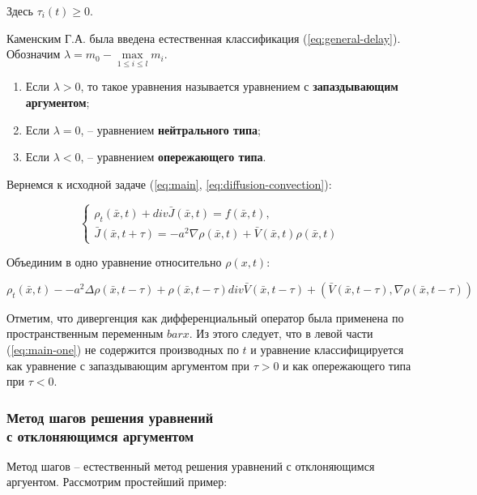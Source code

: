 Здесь $\tau_i(t) \geq 0$.

Каменским Г.А. была введена естественная классификация (\ref{eq:general-delay}). Обозначим $\lambda = m_0 - \max\limits_{1 \leq i \leq l} m_i$.

\begin{enumerate}
\item Если $\lambda > 0$, то такое уравнения называется уравнением с \textbf{запаздывающим аргументом};
\item Если $\lambda = 0$, \--- уравнением \textbf{нейтрального типа};
\item Если $\lambda < 0$, \--- уравнением \textbf{опережающего типа}.
\end{enumerate}

Вернемся к исходной задаче (\ref{eq:main}, \ref{eq:diffusion-convection}):

\begin{equation}
\left\{
\begin{aligned}
\rho_t(\bar{x},t) + div \bar{J}(\bar{x},t) = f(\bar{x},t),\\
\bar{J}(\bar{x},t+\tau) = -a^2 \nabla \rho(\bar{x},t) + \bar{V}(\bar{x},t) \rho(\bar{x},t)
\end{aligned}
\right.
\end{equation}

Объединим в одно уравнение относительно $\rho(x,t)$:

\begin{equation}\label{eq:main-one}
\rho_t(\bar{x},t) - -a^2 \Delta \rho(\bar{x},t-\tau) + \rho(\bar{x},t-\tau) div \bar{V}(\bar{x},t-\tau) + (\bar{V}(\bar{x},t-\tau),\nabla \rho(\bar{x},t-\tau))
\end{equation}

Отметим, что дивергенция как дифференциальный оператор была применена по пространственным переменным $bar{x}$. Из этого следует, что в левой части (\ref{eq:main-one}) не содержится производных по $t$ и уравнение классифицируется как уравнение с запаздывающим аргументом при $\tau>0$ и как опережающего типа при $\tau<0$.

\subsubsection{Метод шагов решения уравнений\\с отклоняющимся аргументом}

Метод шагов \--- естественный метод решения уравнений с отклоняющимся аргуентом. Рассмотрим простейший пример:

